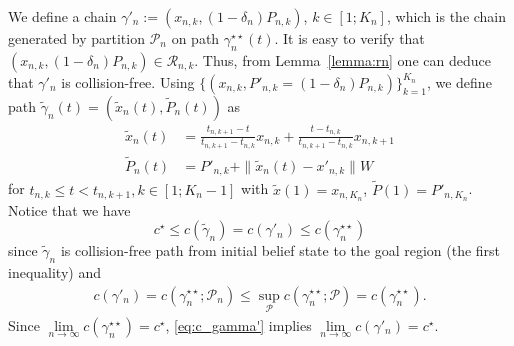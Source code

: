 \documentclass[Afour,sageh,times]{sagej}
\begin{document}
We define a chain $\gamma'_n := (x_{n,k}, (1-\delta_n) P_{n,k})$, $k\in[1;K_n]$, which is the chain generated by partition $\mathcal{P}_n$ on path $\gamma_n^{\star\star}(t)$. It is easy to verify that $(x_{n,k}, (1-\delta_n) P_{n,k}) \in \mathcal{R}_{n,k}$. Thus, from Lemma~\ref{lemma:rn} one can deduce that $\gamma'_n$ is collision-free.   
Using $\{(x_{n,k}, P'_{n,k}= (1-\delta_n) P_{n,k})\}_{k=1}^{K_n}$,
we define path $\widetilde{\gamma}_n(t)=(\widetilde{x}_n(t), \widetilde{P}_n(t))$ as
\begin{align*}
\widetilde{x}_n(t)&= \frac{t_{n,k+1}-t}{t_{n,k+1}-t_{n,k}}x_{n,k}+\frac{t-t_{n,k}}{t_{n,k+1}-t_{n,k}}x_{n,k+1} \\
\widetilde{P}_n(t)&=P'_{n,k}+\|\tilde{x}_n(t)-x'_{n,k}\| W
\end{align*}
for $t_{n,k}\leq t < t_{n,k+1}, k\in[1;K_n-1]$ with $\widetilde{x}(1)=x_{n,K_n}$, $\widetilde{P}(1)=P'_{n,K_n}$.
Notice that we have
\begin{equation}
\label{eq:c_gamma'}
c^\star \leq c(\widetilde{\gamma}_n)=c(\gamma'_n)\leq c(\gamma^{\star\star}_n)
\end{equation}
since $\widetilde{\gamma}_n$ is collision-free path from initial belief state to the goal region (the first inequality) and
\begin{align}
c(\gamma'_n)=c(\gamma^{\star\star}_n;\mathcal{P}_n) \leq \sup_{\mathcal{P}}c(\gamma^{\star\star}_n;\mathcal{P})=c(\gamma^{\star\star}_n).
\label{eqn:cost_gamma_dash_equals_gamma}
\end{align}
Since $\underset{n\rightarrow\infty}{\lim} c(\gamma^{\star\star}_n)=c^\star$, \eqref{eq:c_gamma'} implies $\underset{n\rightarrow\infty}{\lim} c(\gamma'_n)=c^\star$.




\end{document}
